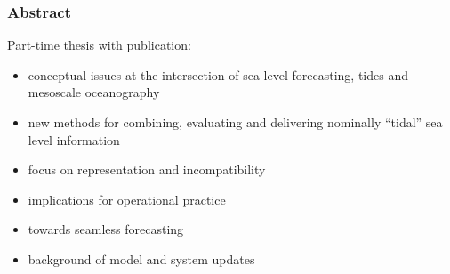 \begin{frame}
\frametitle{Abstract}

Part-time thesis with publication:
\begin{itemize}
    \item conceptual issues at the intersection of sea level forecasting, tides and mesoscale oceanography
    \item new methods for combining, evaluating and delivering nominally ``tidal'' sea level information 
    \item focus on representation and incompatibility
    \item implications for operational practice
    \item towards seamless forecasting
    \item background of model and system updates 
\end{itemize}

\end{frame}